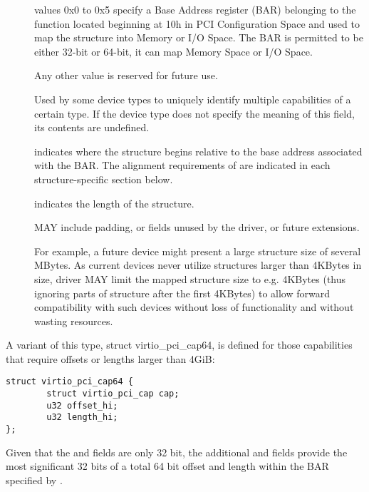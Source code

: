 \begin{description}
\item[]
        values 0x0 to 0x5 specify a Base Address register (BAR) belonging to
        the function located beginning at 10h in PCI Configuration Space
        and used to map the structure into Memory or I/O Space.
        The BAR is permitted to be either 32-bit or 64-bit, it can map Memory Space
        or I/O Space.

        Any other value is reserved for future use.

\item[]
        Used by some device types to uniquely identify multiple capabilities
        of a certain type. If the device type does not specify the meaning of
        this field, its contents are undefined.


\item[]
        indicates where the structure begins relative to the base address associated
        with the BAR.  The alignment requirements of  are indicated
        in each structure-specific section below.

\item[]
        indicates the length of the structure.

         MAY include padding, or fields unused by the driver, or
        future extensions.

        \begin{note}
        For example, a future device might present a large structure size of several
        MBytes.
        As current devices never utilize structures larger than 4KBytes in size,
        driver MAY limit the mapped structure size to e.g.
        4KBytes (thus ignoring parts of structure after the first
        4KBytes) to allow forward compatibility with such devices without loss of
        functionality and without wasting resources.
        \end{note}
\end{description}

A variant of this type, struct virtio_pci_cap64, is defined for
those capabilities that require offsets or lengths larger than
4GiB:

\begin{lstlisting}
struct virtio_pci_cap64 {
        struct virtio_pci_cap cap;
        u32 offset_hi;
        u32 length_hi;
};
\end{lstlisting}

Given that the  and  fields
are only 32 bit, the additional  and 
fields provide the most significant 32 bits of a total 64 bit offset and
length within the BAR specified by .

